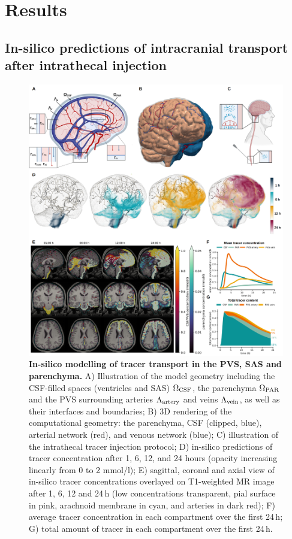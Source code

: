\documentclass[fleqn,10pt]{wlscirep}
\begin{document}
\section*{Results}

\subsection*{In-silico predictions of intracranial transport after intrathecal injection}
\begin{figure}
    \centering
    \includegraphics[width=1\textwidth]{figures/figure1.png}
     \caption{
     \textbf{In-silico modelling of tracer transport in the PVS, SAS and parenchyma.}
     A) Illustration of the model geometry including the CSF-filled spaces (ventricles and SAS) $\Omega_{\rm CSF}$, the parenchyma $\Omega_{\rm PAR}$ and the PVS surrounding arteries $\Lambda_{\rm artery}$ and veins $\Lambda_{\rm vein}$, as well as their interfaces and boundaries; 
     B) 3D rendering of the computational geometry: the parenchyma, CSF (clipped, blue), arterial network (red), and venous network (blue); 
     C) illustration of the intrathecal tracer injection protocol;  
     D) in-silico predictions of tracer concentration after 1, 6, 12, and 24 hours (opacity increasing linearly from 0 to 2 mmol/l); 
     E) sagittal, coronal and axial view of in-silico tracer concentrations overlayed on T1-weighted MR image after 1, 6, 12 and 24\,h (low concentrations transparent, pial surface in pink, arachnoid membrane in cyan, and arteries in dark red); 
     F) average tracer concentration in each compartment over the first 24\,h; 
     G) total amount of tracer in each compartment over the first 24\,h.}
     \label{fig:results1}
\end{figure}
\end{document}
